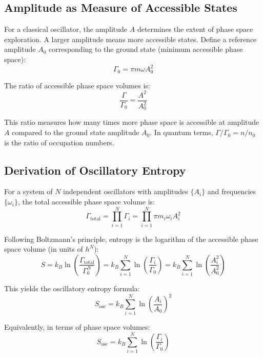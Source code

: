 \subsection{Amplitude as Measure of Accessible States}

For a classical oscillator, the amplitude $A$ determines the extent of phase space exploration. A larger amplitude means more accessible states. Define a reference amplitude $A_0$ corresponding to the ground state (minimum accessible phase space):
\begin{equation}
\Gamma_0 = \pi m\omega A_0^2
\end{equation}

The ratio of accessible phase space volumes is:
\begin{equation}
\frac{\Gamma}{\Gamma_0} = \frac{A^2}{A_0^2}
\end{equation}

This ratio measures how many times more phase space is accessible at amplitude $A$ compared to the ground state amplitude $A_0$. In quantum terms, $\Gamma/\Gamma_0 = n/n_0$ is the ratio of occupation numbers.

\subsection{Derivation of Oscillatory Entropy}

For a system of $N$ independent oscillators with amplitudes $\{A_i\}$ and frequencies $\{\omega_i\}$, the total accessible phase space volume is:
\begin{equation}
\Gamma_{\text{total}} = \prod_{i=1}^{N} \Gamma_i = \prod_{i=1}^{N} \pi m_i \omega_i A_i^2
\end{equation}

Following Boltzmann's principle, entropy is the logarithm of the accessible phase space volume (in units of $h^N$):
\begin{equation}
S = k_B \ln\left(\frac{\Gamma_{\text{total}}}{\Gamma_0^N}\right) = k_B \sum_{i=1}^{N} \ln\left(\frac{\Gamma_i}{\Gamma_0}\right) = k_B \sum_{i=1}^{N} \ln\left(\frac{A_i^2}{A_0^2}\right)
\end{equation}

This yields the oscillatory entropy formula:
\begin{equation}
\boxed{S_{\text{osc}} = k_B \sum_{i=1}^{N} \ln\left(\frac{A_i}{A_0}\right)^2}
\label{eq:oscillatory_entropy}
\end{equation}

Equivalently, in terms of phase space volumes:
\begin{equation}
S_{\text{osc}} = k_B \sum_{i=1}^{N} \ln\left(\frac{\Gamma_i}{\Gamma_0}\right)
\end{equation}

